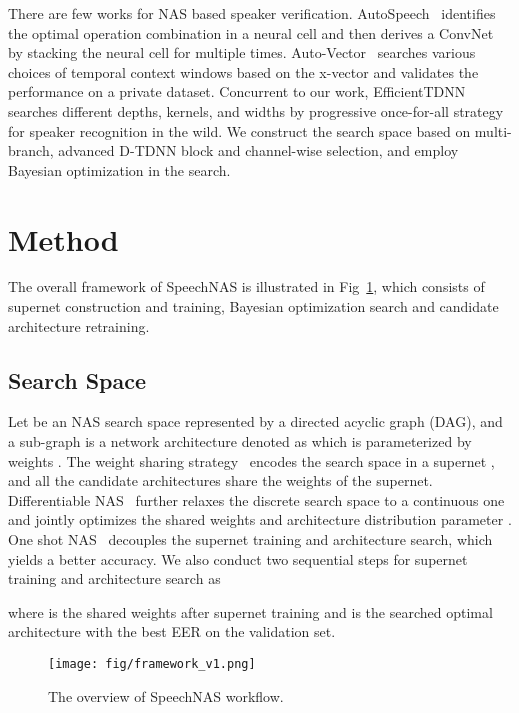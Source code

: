 \documentclass{article}
\begin{document}
There are few works for NAS based speaker verification. AutoSpeech~\cite{ding2020autospeech} identifies the optimal operation combination in a neural cell and then derives a ConvNet by stacking the neural cell for multiple times. Auto-Vector~\cite{qu2020evolutionary} searches various choices of temporal context windows based on the x-vector and validates the performance on a private dataset. Concurrent to our work, EfficientTDNN~\cite{wang2021efficienttdnn} searches different depths, kernels, and widths by progressive once-for-all strategy~\cite{cai2019once} for speaker recognition in the wild. We construct the search space based on multi-branch, advanced D-TDNN block and channel-wise selection, and employ Bayesian optimization in the search.  \section{Method}\label{sec:method}
The overall framework of SpeechNAS is illustrated in Fig~\ref{fig:framework}, which consists of supernet construction and training, Bayesian optimization search and candidate architecture retraining.

\subsection{Search Space}\label{sec:search_space}
Let  be an NAS search space represented by a directed acyclic graph (DAG), and a sub-graph  is a network architecture denoted as  which is parameterized by weights . The weight sharing strategy~\cite{guo2020single} encodes the search space  in a supernet , and all the candidate architectures share the weights  of the supernet. Differentiable NAS~\cite{liu2018darts} further relaxes the discrete search space  to a continuous one  and jointly optimizes the shared weights  and architecture distribution parameter . One shot NAS~\cite{guo2020single} decouples the supernet training and architecture search, which yields a better accuracy. We also conduct two sequential steps for supernet training and architecture search as

where  is the shared weights after supernet training and  is the searched optimal architecture with the best EER on the validation set.
\begin{figure}[t]
\begin{minipage}[b]{1.0\linewidth}
  \centering
  \centerline{\texttt{[image: fig/framework\_v1.png]}}
\end{minipage}
\caption{The overview of SpeechNAS workflow.}
\label{fig:framework}
\end{figure}
\end{document}
